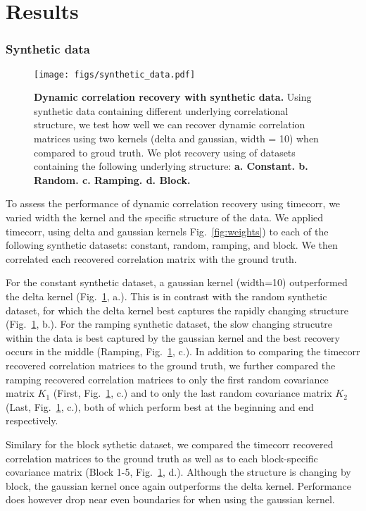 \documentclass[english]{article}
\begin{document}
\section*{Results}
\subsubsection*{Synthetic data}


\begin{figure}
  \centering
  \texttt{[image: figs/synthetic\_data.pdf]}
  \caption{\textbf{Dynamic correlation recovery with synthetic data. } Using synthetic data containing different
    underlying correlational structure,
   we test how well we can recover dynamic correlation matrices using two kernels (delta and gaussian,
    width = 10) when compared to groud truth.  We plot recovery using of datasets containing the
    following underlying structure:
    \textbf{a. Constant. b. Random. c. Ramping.  d. Block.}}
  \label{fig:synthetic_data}
\end{figure}

To assess the performance of dynamic correlation recovery using
timecorr, we varied width the kernel and the specific structure of the
data. We applied timecorr, using delta and gaussian kernels
Fig.~\ref{fig:weights}) to each of the following  
synthetic datasets: constant, random, ramping, and block.  We then correlated each recovered
correlation matrix with the ground truth. 

For the constant synthetic dataset, a gaussian kernel (width=10)
outperformed the delta kernel (Fig.~\ref{fig:synthetic_data},  a.).  This is in contrast with the random
synthetic dataset, for which the delta kernel best captures the
rapidly changing structure (Fig.~\ref{fig:synthetic_data},  b.). For
the ramping synthetic dataset, the slow changing strucutre within the
data is best
captured by the gaussian kernel and the best recovery occurs in the
middle (Ramping, Fig.~\ref{fig:synthetic_data},
c.). In addition to comparing the timecorr recovered correlation
matrices to the ground truth, we
further compared the ramping recovered correlation matrices to only the first random covariance matrix $K_{1}$
(First, Fig.~\ref{fig:synthetic_data},  c.) and to only the last
random covariance matrix $K_{2}$ (Last, Fig.~\ref{fig:synthetic_data},
c.), both of which perform best at the beginning and end respectively.

Similary for the block sythetic dataset, we compared the timecorr
recovered correlation matrices to the ground truth as well as to each
block-specific covariance matrix (Block 1-5,
Fig.~\ref{fig:synthetic_data},  d.).  Although the structure is
changing by block, the gaussian kernel once again outperforms the
delta kernel.  Performance does however drop near even boundaries for
when using the gaussian kernel. 
\end{document}
